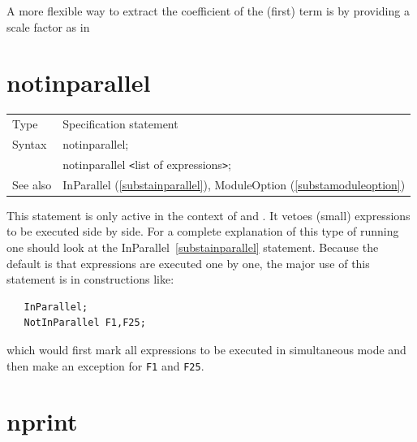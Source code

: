 

A more flexible way to extract the coefficient of the (first) term is by 
providing a scale factor as in

\vspace{10mm}


\section{notinparallel}
\label{substanotinparallel}

\noindent \begin{tabular}{ll}
Type & Specification statement\\
Syntax & notinparallel; \\
       & notinparallel {\tt<}list of expressions{\tt>};
\\ See also & InParallel (\ref{substainparallel}), 
     ModuleOption (\ref{substamoduleoption})
\end{tabular} \vspace{4mm}

\noindent This statement is only active in the context of 
\TFORM{} and \ParFORM{}. It vetoes (small) expressions to be executed side by 
side. For a complete explanation of this type of running one should look at 
the InParallel~\ref{substainparallel} statement. Because the default is 
that expressions are executed one by one, the major use of this statement 
is in constructions like:
\begin{verbatim}
   InParallel;
   NotInParallel F1,F25;
\end{verbatim}
which would first mark all expressions to be executed in simultaneous mode 
and then make an exception for {\tt F1} and {\tt F25}.
\vspace{10mm}


\section{nprint}
\label{substanprint}

